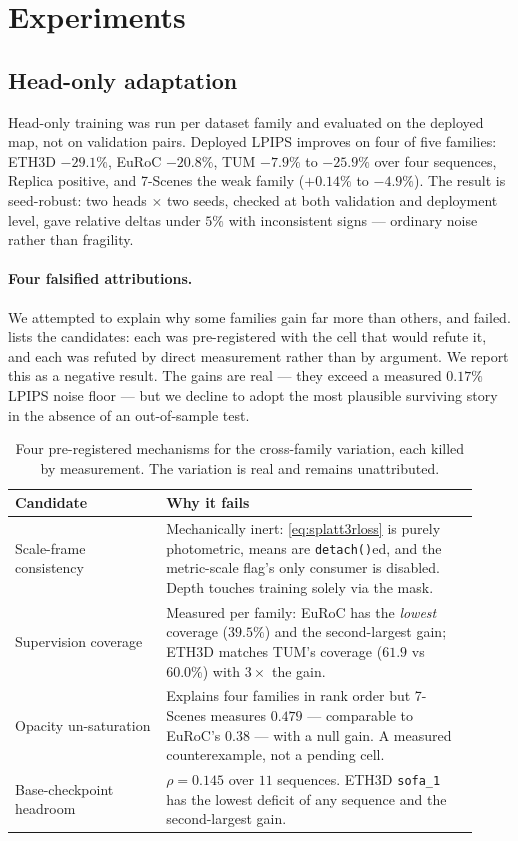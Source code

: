 \section{Experiments}
\label{sec:experiments}

\subsection{Head-only adaptation}
\label{sec:exp:head}
Head-only training was run per dataset family and evaluated on the deployed
map, not on validation pairs. Deployed LPIPS improves on four of five
families: ETH3D $-29.1\%$, EuRoC $-20.8\%$, TUM $-7.9\%$ to $-25.9\%$ over
four sequences, Replica positive, and 7-Scenes the weak family
($+0.14\%$ to $-4.9\%$). The result is seed-robust: two heads $\times$ two
seeds, checked at both validation and deployment level, gave relative deltas
under $5\%$ with inconsistent signs --- ordinary noise rather than fragility.

\paragraph{Four falsified attributions.}
We attempted to explain why some families gain far more than others, and
failed.  lists the candidates: each was pre-registered
with the cell that would refute it, and each was refuted by direct
measurement rather than by argument. We report this as a negative result. The
gains are real --- they exceed a measured $0.17\%$ LPIPS noise floor --- but we
decline to adopt the most plausible surviving story in the absence of an
out-of-sample test.

\begin{table}[t]
\centering\small
\setlength{\tabcolsep}{3pt}
\begin{tabular}{@{}p{0.30\linewidth}p{0.62\linewidth}@{}}
\toprule
Candidate & Why it fails \\
\midrule
Scale-frame consistency &
Mechanically inert: \cref{eq:splatt3rloss} is purely photometric, means are
\texttt{detach()}ed, and the metric-scale flag's only consumer is disabled.
Depth touches training solely via the mask. \\
Supervision coverage &
Measured per family: EuRoC has the \emph{lowest} coverage ($39.5\%$) and the
second-largest gain; ETH3D matches TUM's coverage ($61.9$ vs $60.0\%$) with
$3\times$ the gain. \\
Opacity un-saturation &
Explains four families in rank order but 7-Scenes measures $0.479$ ---
comparable to EuRoC's $0.38$ --- with a null gain. A measured counterexample,
not a pending cell. \\
Base-checkpoint headroom &
$\rho=0.145$ over $11$ sequences. ETH3D \texttt{sofa\_1} has the lowest
deficit of any sequence and the second-largest gain. \\
\bottomrule
\end{tabular}
\caption{Four pre-registered mechanisms for the cross-family variation, each
killed by measurement. The variation is real and remains unattributed.}
\label{tab:falsified}
\end{table}

